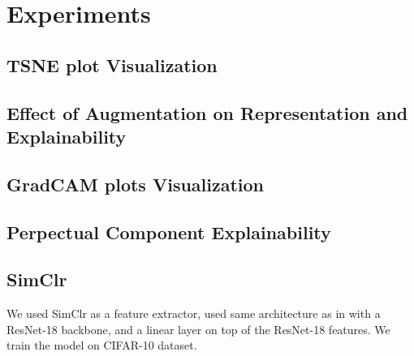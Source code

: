 \section{Experiments}
\label{sec:experiments}

\subsection{TSNE plot Visualization}

\subsection{Effect of Augmentation on Representation and Explainability}  

\subsection{GradCAM plots Visualization}

\subsection{Perpectual Component Explainability}


\subsection{SimClr}
We used SimClr as a feature extractor, used same architecture as in \cite{chen2020simple} with a ResNet-18 backbone, and a linear layer on top of the ResNet-18 features. We train the model on CIFAR-10 dataset.

